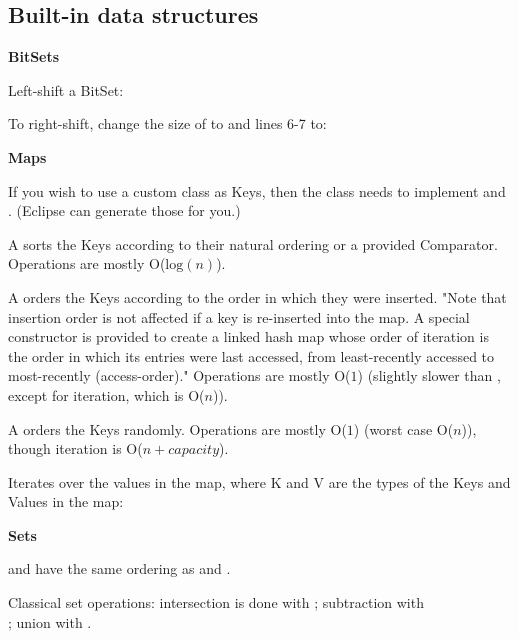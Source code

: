 
\subsection*{Built-in data structures}

\textbf{BitSets}

Left-shift a BitSet:



To right-shift, change the size of  to  and lines 6-7 to:



\textbf{Maps}

If you wish to use a custom class as Keys, then the class needs to implement  and . (Eclipse can generate those for you.)

A  sorts the Keys according to their natural ordering or a provided Comparator. Operations are mostly O($\text{log}(n)$).

A  orders the Keys according to the order in which they were inserted. "Note that insertion order is not affected if a key is re-inserted into the map. A special constructor is provided to create a linked hash map whose order of iteration is the order in which its entries were last accessed, from least-recently accessed to most-recently (access-order)." Operations are mostly O($1$) (slightly slower than , except for iteration, which is O($n$)).

A  orders the Keys randomly. Operations are mostly O($1$) (worst case O($n$)), though iteration is O($n+capacity$).

Iterates over the values in the map, where K and V are the types of the Keys and Values in the map:



\textbf{Sets}

 and  have the same ordering as  and .

Classical set operations: intersection is done with ; subtraction with \\ ; union with  .

